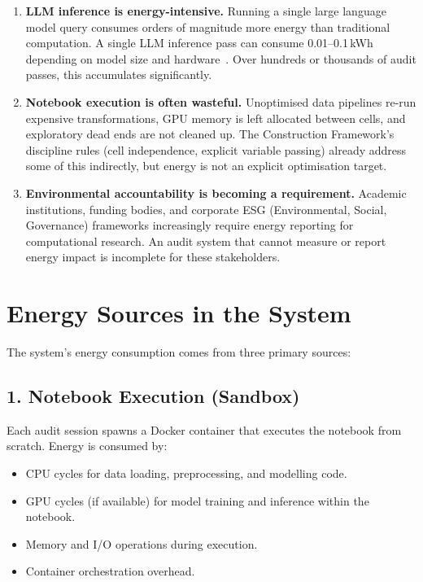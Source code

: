 \documentclass[11pt, a4paper]{article}
\begin{document}
\begin{enumerate}
  \item \textbf{LLM inference is energy-intensive.} Running a single large
    language model query consumes orders of magnitude more energy than
    traditional computation. A single LLM inference pass can consume
    0.01--0.1\,kWh depending on model size and hardware~\cite{paterson2024eco}.
    Over hundreds or thousands of audit passes, this accumulates
    significantly.

  \item \textbf{Notebook execution is often wasteful.} Unoptimised data
    pipelines re-run expensive transformations, GPU memory is left allocated
    between cells, and exploratory dead ends are not cleaned up. The
    Construction Framework's discipline rules (cell independence, explicit
    variable passing) already address some of this indirectly, but energy is
    not an explicit optimisation target.

  \item \textbf{Environmental accountability is becoming a requirement.}
    Academic institutions, funding bodies, and corporate ESG (Environmental,
    Social, Governance) frameworks increasingly require energy reporting for
    computational research. An audit system that cannot measure or report
    energy impact is incomplete for these stakeholders.
\end{enumerate}

\section{Energy Sources in the System}

The system's energy consumption comes from three primary sources:

\subsection*{1. Notebook Execution (Sandbox)}

Each audit session spawns a Docker container that executes the notebook from
scratch. Energy is consumed by:

\begin{itemize}
  \item CPU cycles for data loading, preprocessing, and modelling code.
  \item GPU cycles (if available) for model training and inference within the
    notebook.
  \item Memory and I/O operations during execution.
  \item Container orchestration overhead.
\end{itemize}
\end{document}
